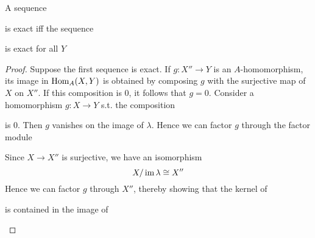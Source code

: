 \documentclass[11pt]{article}
\begin{document}
\begin{proposition}[]
A sequence
\begin{center}\end{center}
is exact iff the sequence
\begin{center}\end{center}
is exact for all \(Y\)
\end{proposition}

\begin{proof}
Suppose the first sequence is exact. If \(g:X''\to Y\) is an \(A\)-homomorphism, its image
in \(\operatorname{Hom}_A(X,Y)\) is obtained by composing \(g\) with the surjective map of \(X\) on \(X''\). If
this composition is 0, it follows that \(g=0\).  Consider a homomorphism \(g:X\to Y\) s.t. the
composition
\begin{center}\end{center}
is 0. Then \(g\) vanishes on the image of \(\lambda\). Hence we can factor \(g\) through the factor module
\begin{center}\end{center}
Since \(X\to X''\) is surjective, we have an isomorphism
\begin{equation*}
X/\operatorname{im}\lambda\cong X''
\end{equation*}
Hence we can factor \(g\) through \(X''\), thereby showing that the kernel of
\begin{center}\end{center}
is contained in the image of
\begin{center}\end{center}
\end{proof}
\end{document}
